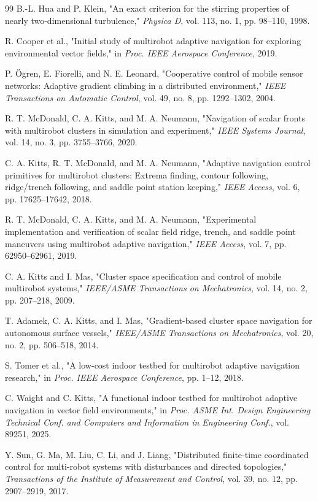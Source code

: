 \documentclass[lettersize,journal]{IEEEtran}
\begin{document}
\begin{thebibliography}{99}
 B.-L. Hua and P. Klein, "An exact criterion for the stirring
properties of nearly two-dimensional turbulence," \textit{Physica D}, vol. 113,
no. 1, pp. 98--110, 1998.

 R. Cooper et al., "Initial study of multirobot adaptive
navigation for exploring environmental vector fields," in \textit{Proc.
IEEE Aerospace Conference}, 2019.

 P. Ögren, E. Fiorelli, and N. E. Leonard, "Cooperative control
of mobile sensor networks: Adaptive gradient climbing in a distributed
environment," \textit{IEEE Transactions on Automatic Control}, vol. 49, no. 8,
pp. 1292--1302, 2004.

 R. T. McDonald, C. A. Kitts, and M. A. Neumann, "Navigation of
scalar fronts with multirobot clusters in simulation and experiment,"
\textit{IEEE Systems Journal}, vol. 14, no. 3, pp. 3755--3766, 2020.

 C. A. Kitts, R. T. McDonald, and M. A. Neumann, "Adaptive
navigation control primitives for multirobot clusters: Extrema finding,
contour following, ridge/trench following, and saddle point station keeping,"
\textit{IEEE Access}, vol. 6, pp. 17625--17642, 2018.

 R. T. McDonald, C. A. Kitts, and M. A. Neumann, "Experimental
implementation and verification of scalar field ridge, trench, and saddle
point maneuvers using multirobot adaptive navigation," \textit{IEEE Access},
vol. 7, pp. 62950--62961, 2019.

 C. A. Kitts and I. Mas, "Cluster space specification and control
of mobile multirobot systems," \textit{IEEE/ASME Transactions on Mechatronics},
vol. 14, no. 2, pp. 207--218, 2009.

 T. Adamek, C. A. Kitts, and I. Mas, "Gradient-based cluster space
navigation for autonomous surface vessels," \textit{IEEE/ASME Transactions on
Mechatronics}, vol. 20, no. 2, pp. 506--518, 2014.

 S. Tomer et al., "A low-cost indoor testbed for multirobot
adaptive navigation research," in \textit{Proc. IEEE Aerospace Conference},
pp. 1--12, 2018.

 C. Waight and C. Kitts, "A functional indoor testbed for
multirobot adaptive navigation in vector field environments," in
\textit{Proc. ASME Int. Design Engineering Technical Conf. and Computers
and Information in Engineering Conf.}, vol. 89251, 2025.

 Y. Sun, G. Ma, M. Liu, C. Li, and J. Liang, "Distributed
finite-time coordinated control for multi-robot systems with disturbances
and directed topologies," \textit{Transactions of the Institute of
Measurement and Control}, vol. 39, no. 12, pp. 2907--2919, 2017.


\end{thebibliography}
\end{document}
